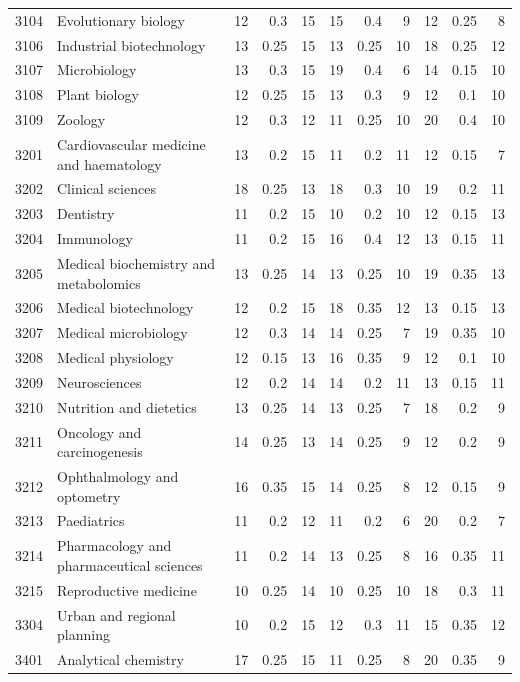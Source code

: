 \begin{longtable}{r p{2.15cm} rrr rrr rrr}
3104 & Evolutionary biology & 12 & 0.3 & 15 & 15 & 0.4 & 9 & 12 & 0.25 & 8 \\
3106 & Industrial biotechnology & 13 & 0.25 & 15 & 13 & 0.25 & 10 & 18 & 0.25 & 12 \\
3107 & Microbiology & 13 & 0.3 & 15 & 19 & 0.4 & 6 & 14 & 0.15 & 10 \\
3108 & Plant biology & 12 & 0.25 & 15 & 13 & 0.3 & 9 & 12 & 0.1 & 10 \\
3109 & Zoology & 12 & 0.3 & 12 & 11 & 0.25 & 10 & 20 & 0.4 & 10 \\
3201 & Cardiovascular medicine and haematology & 13 & 0.2 & 15 & 11 & 0.2 & 11 & 12 & 0.15 & 7 \\
3202 & Clinical sciences & 18 & 0.25 & 13 & 18 & 0.3 & 10 & 19 & 0.2 & 11 \\
3203 & Dentistry & 11 & 0.2 & 15 & 10 & 0.2 & 10 & 12 & 0.15 & 13 \\
3204 & Immunology & 11 & 0.2 & 15 & 16 & 0.4 & 12 & 13 & 0.15 & 11 \\
3205 & Medical biochemistry and metabolomics & 13 & 0.25 & 14 & 13 & 0.25 & 10 & 19 & 0.35 & 13 \\
3206 & Medical biotechnology & 12 & 0.2 & 15 & 18 & 0.35 & 12 & 13 & 0.15 & 13 \\
3207 & Medical microbiology & 12 & 0.3 & 14 & 14 & 0.25 & 7 & 19 & 0.35 & 10 \\
3208 & Medical physiology & 12 & 0.15 & 13 & 16 & 0.35 & 9 & 12 & 0.1 & 10 \\
3209 & Neurosciences & 12 & 0.2 & 14 & 14 & 0.2 & 11 & 13 & 0.15 & 11 \\
3210 & Nutrition and dietetics & 13 & 0.25 & 14 & 13 & 0.25 & 7 & 18 & 0.2 & 9 \\
3211 & Oncology and carcinogenesis & 14 & 0.25 & 13 & 14 & 0.25 & 9 & 12 & 0.2 & 9 \\
3212 & Ophthalmology and optometry & 16 & 0.35 & 15 & 14 & 0.25 & 8 & 12 & 0.15 & 9 \\
3213 & Paediatrics & 11 & 0.2 & 12 & 11 & 0.2 & 6 & 20 & 0.2 & 7 \\
3214 & Pharmacology and pharmaceutical sciences & 11 & 0.2 & 14 & 13 & 0.25 & 8 & 16 & 0.35 & 11 \\
3215 & Reproductive medicine & 10 & 0.25 & 14 & 10 & 0.25 & 10 & 18 & 0.3 & 11 \\
3304 & Urban and regional planning & 10 & 0.2 & 15 & 12 & 0.3 & 11 & 15 & 0.35 & 12 \\
3401 & Analytical chemistry & 17 & 0.25 & 15 & 11 & 0.25 & 8 & 20 & 0.35 & 9 \\

\end{longtable}
